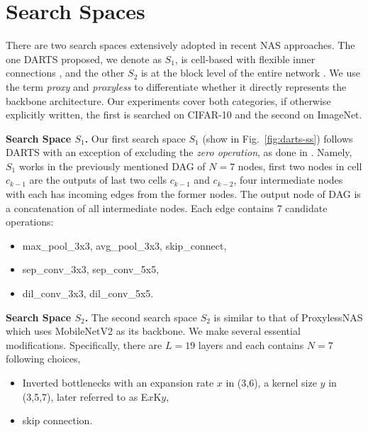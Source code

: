 \documentclass[runningheads]{llncs}
\begin{document}
\section{Search Spaces}\label{sec:ss-supp}

There are two search spaces extensively adopted in recent NAS approaches. The one DARTS proposed, we denote as $S_1$, is cell-based with flexible inner connections \cite{liu2018darts,chen2019progressive}, and the other $S_2$ is at the block level of the entire network \cite{tan2018mnasnet,cai2018proxylessnas,wu2018fbnet}. We use the term \emph{proxy} and \emph{proxyless}  to differentiate whether it directly represents the backbone architecture. Our experiments cover both categories, if otherwise explicitly written, the first is searched on CIFAR-10 and the second on ImageNet. 

\textbf{Search Space $S_1$.} Our first search space $S_1$ (show in Fig.~\ref{fig:darts-ss}) follows DARTS \cite{liu2018darts} with an exception of excluding the \emph{zero operation}, as done in \cite{zela2020understanding}. Namely, $S_1$ works in the previously mentioned DAG of $N = 7$ nodes, first two nodes in cell $c_{k-1}$ are the outputs of last two cells $c_{k-1}$ and $c_{k-2}$, four intermediate nodes with each has incoming edges from the former nodes. The output node of DAG is a concatenation of all intermediate nodes. Each edge contains 7 candidate operations:

\begin{itemize}
	\item max\_pool\_3x3, avg\_pool\_3x3, skip\_connect,
	\item sep\_conv\_3x3, sep\_conv\_5x5,
	\item dil\_conv\_3x3, dil\_conv\_5x5.
\end{itemize}

\textbf{Search Space $S_2$.} The second search space $S_2$ is similar to that of ProxylessNAS  \cite{cai2018proxylessnas} which uses MobileNetV2 \cite{sandler2018mobilenetv2} as its backbone. We make several essential modifications. Specifically, there are $L=19$ layers and each contains $N=7$ following choices,

\begin{itemize}
	\item Inverted bottlenecks with an expansion rate $x$ in (3,6), a kernel size $y$ in (3,5,7), later referred to as E$x$K$y$, \item skip connection.
\end{itemize}
\end{document}
